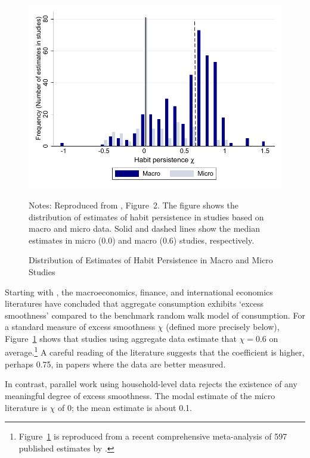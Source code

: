 \documentclass[titlepage]{article}
\begin{document}


\begin{figure}
  \centering
\caption{Distribution of Estimates of Habit Persistence in Macro and Micro Studies}
\label{microMacroMetaHistogram}
    { \includegraphics[width=1.0\textwidth]{./Figures/microMacroMetaHistogram}}

    \begin{flushleft}
      \footnotesize Notes: Reproduced from \cite{hrsHabit}, Figure~2. The figure shows the distribution of estimates of habit persistence in studies based on macro and micro data. Solid and dashed lines show the median estimates in micro (0.0) and macro (0.6) studies, respectively.
      \end{flushleft}
\end{figure}

Starting with \cite{cdSmooth}, the macroeconomics, finance, and international economics literatures have concluded that aggregate consumption exhibits `excess smoothness' compared to the benchmark \cite{hallRandomWalk} random walk model of consumption. For a standard measure of excess smoothness $\chi$ (defined more precisely below), Figure~\ref{microMacroMetaHistogram} shows that studies using aggregate data estimate that $\chi=0.6$ on average.\footnote{Figure~\ref{microMacroMetaHistogram} is reproduced from a recent comprehensive meta-analysis of 597 published estimates by \cite{hrsHabit}.} A careful reading of the literature suggests that the coefficient is higher, perhaps 0.75, in papers where the data are better measured.

In contrast, parallel work using household-level data rejects the existence of any meaningful degree of excess smoothness.  The modal estimate of the micro literature is $\chi$ of 0; the mean estimate is about 0.1. 
\end{document}
